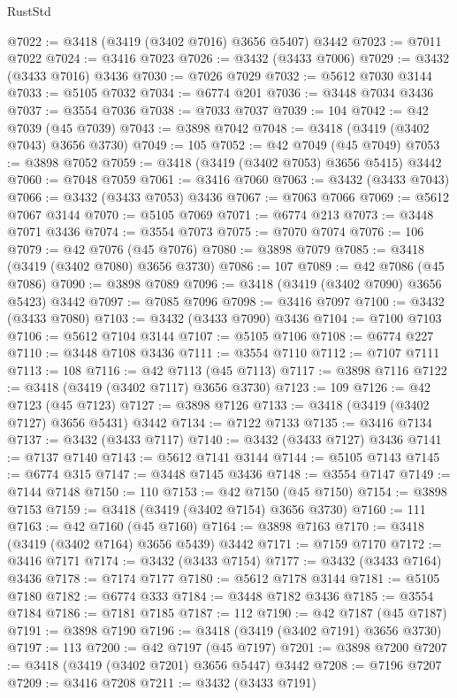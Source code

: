 \begin{lexlean}{RustStd}
\begin{coremodule}
@7022 := @3418 (@3419 (@3402 @7016) @3656 @5407) @3442
@7023 := @7011 @7022
@7024 := @3416 @7023
@7026 := @3432 (@3433 @7006)
@7029 := @3432 (@3433 @7016) @3436
@7030 := @7026 @7029
@7032 := @5612 @7030 @3144
@7033 := @5105 @7032
@7034 := @6774 @201
@7036 := @3448 @7034 @3436
@7037 := @3554 @7036
@7038 := @7033 @7037
@7039 := 104
@7042 := @42 @7039 (@45 @7039)
@7043 := @3898 @7042
@7048 := @3418 (@3419 (@3402 @7043) @3656 @3730)
@7049 := 105
@7052 := @42 @7049 (@45 @7049)
@7053 := @3898 @7052
@7059 := @3418 (@3419 (@3402 @7053) @3656 @5415) @3442
@7060 := @7048 @7059
@7061 := @3416 @7060
@7063 := @3432 (@3433 @7043)
@7066 := @3432 (@3433 @7053) @3436
@7067 := @7063 @7066
@7069 := @5612 @7067 @3144
@7070 := @5105 @7069
@7071 := @6774 @213
@7073 := @3448 @7071 @3436
@7074 := @3554 @7073
@7075 := @7070 @7074
@7076 := 106
@7079 := @42 @7076 (@45 @7076)
@7080 := @3898 @7079
@7085 := @3418 (@3419 (@3402 @7080) @3656 @3730)
@7086 := 107
@7089 := @42 @7086 (@45 @7086)
@7090 := @3898 @7089
@7096 := @3418 (@3419 (@3402 @7090) @3656 @5423) @3442
@7097 := @7085 @7096
@7098 := @3416 @7097
@7100 := @3432 (@3433 @7080)
@7103 := @3432 (@3433 @7090) @3436
@7104 := @7100 @7103
@7106 := @5612 @7104 @3144
@7107 := @5105 @7106
@7108 := @6774 @227
@7110 := @3448 @7108 @3436
@7111 := @3554 @7110
@7112 := @7107 @7111
@7113 := 108
@7116 := @42 @7113 (@45 @7113)
@7117 := @3898 @7116
@7122 := @3418 (@3419 (@3402 @7117) @3656 @3730)
@7123 := 109
@7126 := @42 @7123 (@45 @7123)
@7127 := @3898 @7126
@7133 := @3418 (@3419 (@3402 @7127) @3656 @5431) @3442
@7134 := @7122 @7133
@7135 := @3416 @7134
@7137 := @3432 (@3433 @7117)
@7140 := @3432 (@3433 @7127) @3436
@7141 := @7137 @7140
@7143 := @5612 @7141 @3144
@7144 := @5105 @7143
@7145 := @6774 @315
@7147 := @3448 @7145 @3436
@7148 := @3554 @7147
@7149 := @7144 @7148
@7150 := 110
@7153 := @42 @7150 (@45 @7150)
@7154 := @3898 @7153
@7159 := @3418 (@3419 (@3402 @7154) @3656 @3730)
@7160 := 111
@7163 := @42 @7160 (@45 @7160)
@7164 := @3898 @7163
@7170 := @3418 (@3419 (@3402 @7164) @3656 @5439) @3442
@7171 := @7159 @7170
@7172 := @3416 @7171
@7174 := @3432 (@3433 @7154)
@7177 := @3432 (@3433 @7164) @3436
@7178 := @7174 @7177
@7180 := @5612 @7178 @3144
@7181 := @5105 @7180
@7182 := @6774 @333
@7184 := @3448 @7182 @3436
@7185 := @3554 @7184
@7186 := @7181 @7185
@7187 := 112
@7190 := @42 @7187 (@45 @7187)
@7191 := @3898 @7190
@7196 := @3418 (@3419 (@3402 @7191) @3656 @3730)
@7197 := 113
@7200 := @42 @7197 (@45 @7197)
@7201 := @3898 @7200
@7207 := @3418 (@3419 (@3402 @7201) @3656 @5447) @3442
@7208 := @7196 @7207
@7209 := @3416 @7208
@7211 := @3432 (@3433 @7191)

\end{coremodule}
\end{lexlean}
